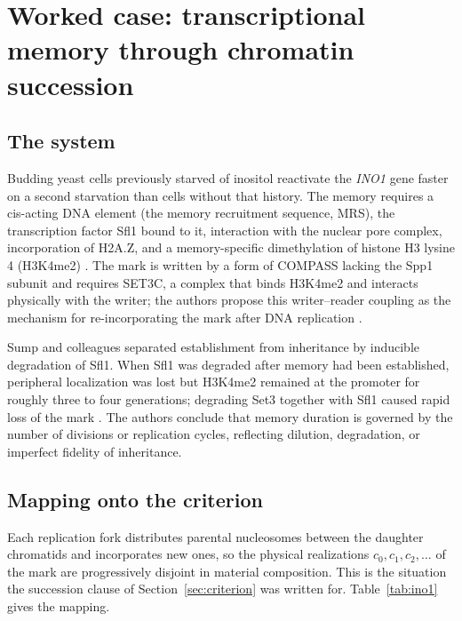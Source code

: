 \section{Worked case: transcriptional memory through chromatin succession}
\label{sec:ino1}

\subsection{The system}

Budding yeast cells previously starved of inositol reactivate the \textit{INO1}
gene faster on a second starvation than cells without that history. The memory
requires a cis-acting DNA element (the memory recruitment sequence, MRS), the
transcription factor Sfl1 bound to it, interaction with the nuclear pore
complex, incorporation of H2A.Z, and a memory-specific dimethylation of histone
H3 lysine 4 (H3K4me2) \citep{LightEtAl2010INO1,SumpEtAl2022INO1Memory}. The mark
is written by a form of COMPASS lacking the Spp1 subunit and requires SET3C, a
complex that binds H3K4me2 and interacts physically with the writer; the
authors propose this writer--reader coupling as the mechanism for
re-incorporating the mark after DNA replication \citep{SumpEtAl2022INO1Memory}.

Sump and colleagues separated establishment from inheritance by inducible
degradation of Sfl1. When Sfl1 was degraded after memory had been established,
peripheral localization was lost but H3K4me2 remained at the promoter for
roughly three to four generations; degrading Set3 together with Sfl1 caused
rapid loss of the mark \citep{SumpEtAl2022INO1Memory}. The authors conclude
that memory duration is governed by the number of divisions or replication
cycles, reflecting dilution, degradation, or imperfect fidelity of inheritance.

\subsection{Mapping onto the criterion}

Each replication fork distributes parental nucleosomes between the daughter
chromatids and incorporates new ones, so the physical realizations
$c_0,c_1,c_2,\ldots$ of the mark are progressively disjoint in material
composition. This is the situation the succession clause of
Section~\ref{sec:criterion} was written for. Table~\ref{tab:ino1} gives the
mapping.

